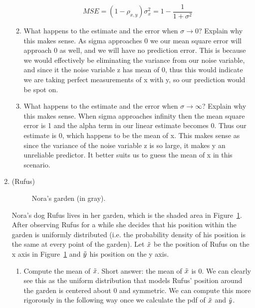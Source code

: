 \documentclass[12pt,twoside]{article}
\newcommand{\ry}{\rnd{ y}  }
\newcommand{\rx}{\rnd{ x}  }
\newcommand{\rnd}{\Tilde}
\begin{document}
\begin{enumerate}
\begin{enumerate}
$$
    MSE = (1-\rho_{x,y})\sigma_x^2 = 1 - \frac{1}{1+\sigma^2}
$$
\item What happens to the estimate and the error when $\sigma \rightarrow 0$? Explain why this makes sense. 
\subitem
As sigma approaches 0 we our mean square error will approach 0 as well, and we will have no prediction error. This is because we would effectively be eliminating the variance from our noise variable, and since it the noise variable z has mean of 0, thus this would indicate we are taking perfect measurements of x with y, so our prediction would be spot on. 
\item What happens to the estimate and the error when $\sigma \rightarrow \infty$? Explain why this makes sense. 
\subitem When sigma approaches infinity then the mean square error is 1 and the alpha term in our linear estimate becomes 0. Thus our estimate is 0, which happens to be the mean of x. This makes sense as since the variance of the noise variable z is so large, it makes y an unreliable predictor. It better suits us to guess the mean of x in this scenario.
\end{enumerate}


\item (Rufus)
\begin{figure}[h]
\begin{center}
\end{center}
\caption{Nora's garden (in gray).}
\label{fig:garden}
\end{figure}
Nora's dog Rufus lives in her garden, which is the shaded area in Figure~\ref{fig:garden}. After observing Rufus for a while she decides that his position within the garden is uniformly distributed (i.e. the probability density of his position is the same at every point of the garden). Let $\rx$ be the position of Rufus on the x axis in Figure~\ref{fig:garden} and $\ry$ his position on the y axis.
\begin{enumerate}
\item Compute the mean of $\rx$.
\subitem Short answer: the mean of $\rx$ is 0. We can clearly see this as the uniform distribution that models Rufus' position around the garden is centered about 0 and symmetric. We can compute this more rigorously in the following way once we calculate the pdf of $\rx$ and $\ry$.


\end{enumerate}
\end{enumerate}
\end{document}
